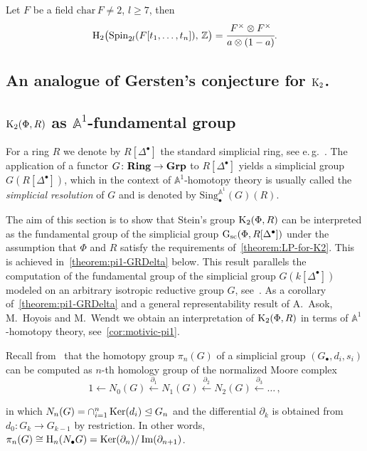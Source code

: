 \documentclass[oneside, 11pt]{amsart} \pdfoutput=1
\begin{document}
\begin{corollary}
Let $F$ be a field $\mathrm{char}\,F\neq2$, $l\geq7$, then
$$
\mathrm H_2\big(\mathrm{Spin}_{2l}(F[t_1,\ldots,t_n]),\,\mathbb Z\big)=\cfrac{F^\times\otimes F^\times}{a\otimes(1-a)}.
$$
\end{corollary}
\subsection{An analogue of Gersten's conjecture for ${\mathrm{K}}_2$.} \label{sec:K2-GC}

\subsection{\texorpdfstring{${\mathrm{K}}_2(\Phi, R)$}{K2(R)} as $\mathbb{A}^1$-fundamental group}
For a ring $R$ we denote by $R[\Delta^\bullet]$ the standard simplicial ring, see e.\,g.~\cite{Jar83}. The application of a functor $G\colon{\normalfont\textbf{Ring}}\rightarrow{\normalfont\textbf{Grp}}$ to $R[\Delta^\bullet]$ yields a simplicial group $G(R[\Delta^\bullet])$, which in the context of $\mathbb{A}^1$-homotopy theory is usually called the {\it simplicial resolution} of $G$ and is denoted by $\mathrm{Sing}^{\mathbb{A}^1}_\bullet(G)(R)$.

The aim of this section is to show that Stein's group ${\mathrm{K}}_2(\Phi, R)$ can be interpreted as the fundamental group of the simplicial group $\mathrm{G}_\mathrm{sc}(\Phi, R[\Delta^\bullet])$ under the assumption that $\Phi$ and $R$ satisfy the requirements of~\cref{theorem:LP-for-K2}. This is achieved in~\cref{theorem:pi1-GRDelta} below. This result parallels the computation of the fundamental group of the simplicial group $G(k[\Delta^\bullet])$ modeled on an arbitrary isotropic reductive group $G$, see~\cite[Proposition~3.2]{VW16}. As a corollary of~\cref{theorem:pi1-GRDelta} and a general representability result of A.~Asok, M.~Hoyois and M.~Wendt we obtain an interpretation of ${\mathrm{K}}_2(\Phi, R)$ in terms of $\mathbb{A}^1$-homotopy theory, see~\cref{cor:motivic-pi1}.

Recall from~\cite[\S~17]{May67} that the homotopy group $\pi_n(G)$ of a simplicial group $(G_\bullet, d_i, s_i)$ can be computed as $n$-th homology group of the normalized Moore complex
\[
1 \leftarrow N_0(G) \xleftarrow{\partial_1} N_1(G) \xleftarrow{\partial_2} N_2(G) \xleftarrow{\partial_3} \ldots\,,
\]
\iffalse\[\begin{tikzcd} 1 & N_0(G) \ar[l] & N_1(G) \ar{l}[swap]{\partial_1} & N_2(G) \ar{l}[swap]{\partial_2} & \ar{l}[swap]{\partial_3} \ldots, \end{tikzcd} \] \fi
in which $N_n(G) = \cap_{i=1}^n\mathop{\mathrm{Ker}}\nolimits(d_i) \trianglelefteq G_n$ and the differential $\partial_k$ is obtained from $d_0\colon G_k \to G_{k-1}$ by restriction. In other words, $\pi_n(G) \cong \mathrm{H}_n(N_\bullet G) = \mathop{\mathrm{Ker}}\nolimits(\partial_n) / \mathop{\mathrm{Im}}\nolimits(\partial_{n+1})$.
\end{document}
